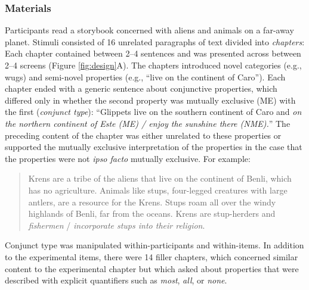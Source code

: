 \documentclass[10pt,letterpaper]{article}
\begin{document}
\subsubsection{Materials}

Participants read a storybook concerned with aliens and animals on a far-away planet.
Stimuli consisted of 16 unrelated paragraphs of text divided into \emph{chapters}: Each chapter contained between 2--4 sentences and was presented across between 2--4 screens (Figure \ref{fig:design}A).
The chapters introduced novel categories (e.g., wugs) and semi-novel properties (e.g., ``live on the continent of Caro'').
Each chapter ended with a generic sentence about conjunctive properties, which differed only in whether the second property was mutually exclusive (ME) with the first (\emph{conjunct type}): ``Glippets live on the southern continent of Caro and \emph{on the northern continent of Este (ME) /  enjoy the sunshine there (NME).}''
The preceding content of the chapter was either unrelated to these properties or supported the mutually exclusive interpretation of the properties in the case that the properties were not \emph{ipso facto} mutually exclusive. For example: 

\begin{quote}
\small
Krens are a tribe of the aliens that live on the continent of Benli, which has no agriculture. Animals like stups, four-legged creatures with large antlers, are a resource for the Krens. Stups roam all over the windy highlands of Benli, far from the oceans. Krens are stup-herders and \emph{fishermen} / \emph{incorporate stups into their religion}.
\end{quote}

Conjunct type was manipulated within-participants and within-items. 
In addition to the experimental items, there were 14 filler chapters, which concerned similar content to the experimental chapter but which asked about properties that were described with explicit quantifiers such as \emph{most}, \emph{all}, or \emph{none}. 
\end{document}
